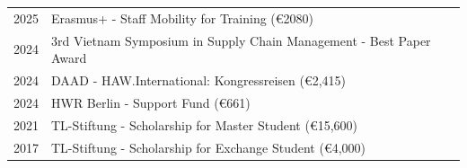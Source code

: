 
\begin{longtable}[l]{@{}p{} p{}}

    2025 & Erasmus+ - Staff Mobility for Training (€2080) \\
    
    
    2024 & 3rd Vietnam Symposium in Supply Chain Management - Best Paper Award \\
   
    2024 & DAAD - HAW.International: Kongressreisen (€2,415) \\

    2024 & HWR Berlin - Support Fund (€661) \\

    2021 & TL-Stiftung - Scholarship for Master Student (€15,600) \\

    2017 & TL-Stiftung - Scholarship for Exchange Student (€4,000) \\


   
\end{longtable}
